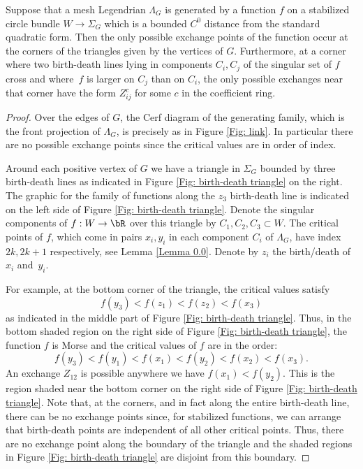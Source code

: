 \begin{lemma}\label{possible exchange points}
Suppose that a mesh Legendrian $\Lambda_G$ is generated by a function $f$ on a stabilized circle bundle $W \to \Sigma_G$ which is a bounded $C^0$ distance from the standard quadratic form. Then the only possible exchange points of the function occur at the corners of the triangles given by the vertices of $G$. Furthermore, at a corner where two birth-death lines lying in components $C_i,C_j$ of the singular set of $f$ cross and where~$f$ is larger on $C_j$ than on $C_i$, the only possible exchanges near that corner have the form $Z_{ij}^c$ for some $c$ in the coefficient ring.
\end{lemma}

\begin{proof}
Over the edges of $G$, the Cerf diagram of the generating family, which is the front projection of $\Lambda_G$, is precisely as in Figure \ref{Fig: link}. In particular there are no possible exchange points since the critical values are in order of index.

Around each positive vertex of $G$ we have a triangle in $\Sigma_G$ bounded by three birth-death lines as indicated in Figure \ref{Fig: birth-death triangle} on the right. The graphic for the family of functions along the $z_3$ birth-death line is indicated on the left side of Figure \ref{Fig: birth-death triangle}. Denote the singular components of $f:W \to \bR$ over this triangle by $C_1,C_2,C_3 \subset W$. The critical points of $f$, which come in pairs $x_i,y_i$ in each component $C_i$ of $\Lambda_G$, have index $2k, 2k+1$ respectively, see Lemma \ref{Lemma 0.0}. Denote by $z_i$ the birth/death of~$x_i$ and~$y_i$.

For example, at the bottom corner of the triangle, the critical values satisfy
\[
f(y_3)<f(z_1)<f(z_2)<f(x_3)
\]
as indicated in the middle part of Figure \ref{Fig: birth-death triangle}. Thus, in the bottom shaded region on the right side of Figure \ref{Fig: birth-death triangle}, the function $f$ is Morse and the critical values of $f$ are in the order:
\[
f(y_3)< f(y_1)< \boxed{f(x_1)< f(y_2)}<f(x_2)<f(x_3).
\]
An exchange $Z_{12}$ is possible anywhere we have $f(x_1)<f(y_2)$. This is the region shaded near the bottom corner on the right side of Figure \ref{Fig: birth-death triangle}. Note that, at the corners, and in fact along the entire birth-death line, there can be no exchange points since, for stabilized functions, we can arrange that birth-death points are independent of all other critical points. Thus, there are no exchange point along the boundary of the triangle and the shaded regions in Figure \ref{Fig: birth-death triangle} are disjoint from this boundary.


\end{proof}

